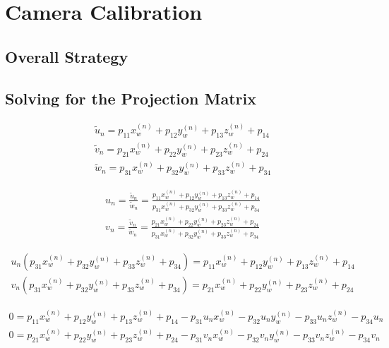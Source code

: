 \section{Camera Calibration} \label{sec:projection}

\subsection{Overall Strategy}



\subsection{Solving for the Projection Matrix}

\begin{align*}
    \widetilde{u}_n = p_{11}x_w^{(n)} + p_{12}y_w^{(n)} + p_{13}z_w^{(n)} + p_{14} \\
    \widetilde{v}_n = p_{21}x_w^{(n)} + p_{22}y_w^{(n)} + p_{23}z_w^{(n)} + p_{24} \\
    \widetilde{w}_n = p_{31}x_w^{(n)} + p_{32}y_w^{(n)} + p_{33}z_w^{(n)} + p_{34}
\end{align*}

\begin{align*}
    u_n = \frac{\widetilde{u}_n}{\widetilde{w}_n} = \frac{p_{11}x_w^{(n)} + p_{12}y_w^{(n)} + p_{13}z_w^{(n)} + p_{14}}{p_{31}x_w^{(n)} + p_{32}y_w^{(n)} + p_{33}z_w^{(n)} + p_{34}} \\
    v_n = \frac{\widetilde{v}_n}{\widetilde{w}_n} = \frac{p_{21}x_w^{(n)} + p_{22}y_w^{(n)} + p_{23}z_w^{(n)} + p_{24}}{p_{31}x_w^{(n)} + p_{32}y_w^{(n)} + p_{33}z_w^{(n)} + p_{34}}
\end{align*}

\begin{align*}
    u_n(p_{31}x_w^{(n)} + p_{32}y_w^{(n)} + p_{33}z_w^{(n)} + p_{34}) = p_{11}x_w^{(n)} + p_{12}y_w^{(n)} + p_{13}z_w^{(n)} + p_{14} \\
    v_n(p_{31}x_w^{(n)} + p_{32}y_w^{(n)} + p_{33}z_w^{(n)} + p_{34}) = p_{21}x_w^{(n)} + p_{22}y_w^{(n)} + p_{23}z_w^{(n)} + p_{24}
\end{align*}

\begin{subequations}
    \begin{align}
        0 = p_{11}x_w^{(n)} + p_{12}y_w^{(n)} + p_{13}z_w^{(n)} + p_{14} - p_{31}u_nx_w^{(n)} - p_{32}u_ny_w^{(n)} - p_{33}u_nz_w^{(n)} - p_{34}u_n \\
        0 = p_{21}x_w^{(n)} + p_{22}y_w^{(n)} + p_{23}z_w^{(n)} + p_{24} - p_{31}v_nx_w^{(n)} - p_{32}v_ny_w^{(n)} - p_{33}v_nz_w^{(n)} - p_{34}v_n
    \end{align}
\end{subequations}

